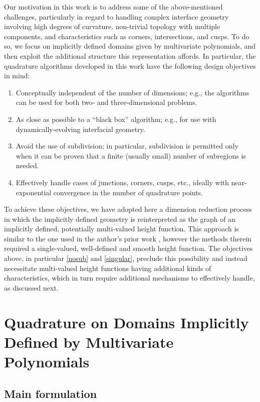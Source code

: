 \documentclass[onefignum,onetabnum,onealgnum,oneeqnum]{siamart190516}
\begin{document}
Our motivation in this work is to address some of the above-mentioned challenges, particularly in regard to handling complex interface geometry involving high degrees of curvature, non-trivial topology with multiple components, and characteristics such as corners, intersections, and cusps. To do so, we focus on implicitly defined domains given by multivariate polynomials, and then exploit the additional structure this representation affords. In particular, the quadrature algorithms developed in this work have the following design objectives in mind:
\begin{enumerate}[label=(\roman*),leftmargin=3em]
\item Conceptually independent of the number of dimensions; e.g., the algorithms can be used for both two- and three-dimensional problems.
\item As close as possible to a ``black box'' algorithm; e.g., for use with dynamically-evolving interfacial geometry.
%
%
\item \label{nosub} Avoid the use of subdivision; in particular, subdivision is permitted only when it can be proven that a finite (usually small) number of subregions is needed.
\item \label{singular} Effectively handle cases of junctions, corners, cusps, etc., ideally with near-exponential convergence in the number of quadrature points.
\end{enumerate}
To achieve these objectives, we have adopted here a dimension reduction process in which the implicitly defined geometry is reinterpreted as the graph of an implicitly defined, potentially multi-valued height function. This approach is similar to the one used in the author's prior work \cite{HighorderImplicitQuad}, however the methods therein required a single-valued, well-defined and smooth height function. The objectives above, in particular \ref{nosub} and \ref{singular}, preclude this possibility and instead necessitate multi-valued height functions having additional kinds of characteristics, which in turn require additional mechanisms to effectively handle, as discussed next. %
%





\section{Quadrature on Domains Implicitly Defined by Multivariate Polynomials}
\label{sec:driver}

\subsection{Main formulation}
\label{sec:mainformulation}
 
\end{document}
